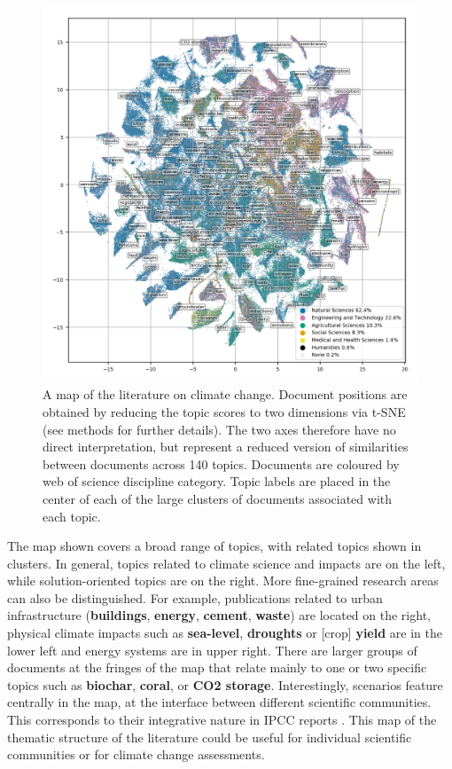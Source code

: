 \documentclass{article}
\begin{document}
\begin{linenumbers}
		
		\begin{figure}[htp]
			\begin{center}
				\includegraphics[width=180mm]{../plots_pub/all_topic_words_oecds.png}
				\caption{A map of the literature on climate change. Document positions are obtained by reducing the topic scores to two dimensions via t-SNE (see methods for further details). The two axes therefore have no direct interpretation, but represent a reduced version of similarities between documents across 140 topics. Documents are coloured by web of science discipline category. Topic labels are placed in the center of each of the large clusters of documents associated with each topic. }
				\label{oecd_topic_map}
			\end{center}
		\end{figure}
		
		
		
		The map shown covers a broad range of topics, with related topics shown in clusters. In general, topics related to climate science and impacts are on the left, while solution-oriented topics are on the right. More fine-grained research areas can also be distinguished. For example, publications related to urban infrastructure (\textbf{buildings}, \textbf{energy}, \textbf{cement}, \textbf{waste}) are located on the right, physical climate impacts such as \textbf{sea-level}, \textbf{droughts}  or [crop] \textbf{yield} are in the lower left and energy systems are in upper right. There are larger groups of documents at the fringes of the map that relate mainly to one or two specific topics such as \textbf{biochar}, \textbf{coral}, or \textbf{CO2 storage}. Interestingly, scenarios feature centrally in the map, at the interface between different scientific communities. This corresponds to their integrative nature in IPCC reports \cite{Moss2010}. This map of the thematic structure of the literature could be useful for individual scientific communities or for climate change assessments.
		

\end{linenumbers}
\end{document}

